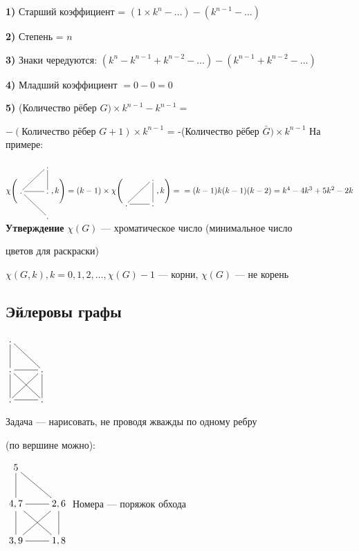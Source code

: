 \documentclass[a4paper, 12pt] {article}
\begin{document}
\textbf{1)} Старший коэффициент = $ (1\times k^{n}-\dots)-( k^{n-1}-\dots) $

\textbf{ 2)} Степень = $ n $

\textbf{ 3)} Знаки чередуются: $ (k^{n}-k^{n-1}+k^{n-2}-\dots)-(k^{n-1}+k^{n-2}-\dots)$

\textbf{ 4)} Младший коэффициент $ = 0-0=0 $

\textbf{ 5)} (Количество рёбер $ G) \times k^{n-1}-k^{n-1}=$ 

 $-(\text{Количество рёбер }G+1) \times k^{n-1}$ = -(Количество рёбер $ \bar G) \times k^{n-1}$
 \newpage 
 На примере:
 
 $ \chi \Bigg( \begin{matrix}
 	\xymatrix{
 		& . \ar@{-}[ld] \ar@{-}[d]  \\
 		. \ar@{-}[r] \ar@{-}[rd]& . \\
 		 & .   \\
 	}
 \end{matrix}, k \Bigg)=(k-1)\times
 \chi \Bigg( \begin{matrix}
	\xymatrix{
		& . \ar@{-}[ld] \ar@{-}[d]  \\
		. \ar@{-}[r] & . \\
	}
\end{matrix}, k \Bigg)=\\=(k-1)k(k-1)(k-2)=k^{4}-4k^{3}+5k^{2}-2k
 $\\
 
\textbf{Утверждение} $ \chi (G) $ --- хроматическое число (минимальное число

 цветов для раскраски)

$ \chi (G, k), k = 0, 1, 2, \dots, \chi (G)-1 $ --- корни, $  \chi (G) $ --- не корень

\subsection{Эйлеровы графы}

$ \begin{matrix}
	\xymatrix{
		. \ar@{-}[rd]  \ar@{-}[d]  \\
		. \ar@{-}[d] \ar@{-}[r] \ar@{-}[rd]& . \ar@{-}[ld] \ar@{-}[d]  \\
		. \ar@{-}[r] & . \\
	}
\end{matrix} $ 

Задача --- нарисовать, не проводя жважды по одному ребру 

(по вершине можно):

$ \begin{matrix}
	\xymatrix{
		5 \ar@{-}[rd]  \ar@{-}[d]  \\
		4, 7 \ar@{-}[d] \ar@{-}[r] \ar@{-}[rd]& 2, 6 \ar@{-}[ld] \ar@{-}[d]  \\
		3, 9 \ar@{-}[r] & 1, 8 \\
	}
\end{matrix} $ Номера --- поряжок обхода\\
\end{document}
